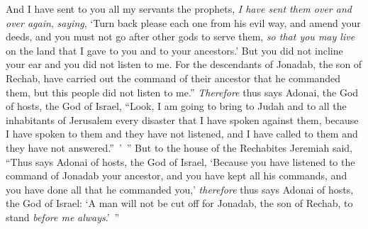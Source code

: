\begin{biblechapter}
\verse And I have sent to you all my servants the prophets, \textit{I have sent them over and over again}, \textit{saying}, ‘Turn back please each one from his evil way, and amend your deeds, and you must not go after other gods to serve them, \textit{so that you may live} on the land that I gave to you and to your ancestors.’ But you did not incline your ear and you did not listen to me.
\verse For the descendants of Jonadab, the son of Rechab, have carried out the command of their ancestor that he commanded them, but this people did not listen to me.”
\verse \textit{Therefore} thus says Adonai, the God of hosts, the God of Israel, “Look, I am going to bring to Judah and to all the inhabitants of Jerusalem every disaster that I have spoken against them, because I have spoken to them and they have not listened, and I have called to them and they have not answered.” ’ ”
\verse But to the house of the Rechabites Jeremiah said, “Thus says Adonai of hosts, the God of Israel, ‘Because you have listened to the command of Jonadab your ancestor, and you have kept all his commands, and you have done all that he commanded you,’
\verse \textit{therefore} thus says Adonai of hosts, the God of Israel: ‘A man will not be cut off for Jonadab, the son of Rechab, to stand \textit{before me} \textit{always}.’ ”
\end{biblechapter}

